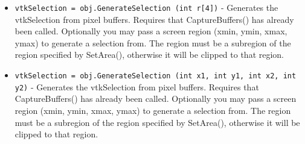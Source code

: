 \begin{itemize}
\item  \verb|vtkSelection = obj.GenerateSelection (int r[4])| -  Generates the vtkSelection from pixel buffers.
 Requires that CaptureBuffers() has already been called.
 Optionally you may pass a screen region (xmin, ymin, xmax, ymax)
 to generate a selection from. The region must be a subregion
 of the region specified by SetArea(), otherwise it will be
 clipped to that region.

\item  \verb|vtkSelection = obj.GenerateSelection (int x1, int y1, int x2, int y2)| -  Generates the vtkSelection from pixel buffers.
 Requires that CaptureBuffers() has already been called.
 Optionally you may pass a screen region (xmin, ymin, xmax, ymax)
 to generate a selection from. The region must be a subregion
 of the region specified by SetArea(), otherwise it will be
 clipped to that region.

\end{itemize}
